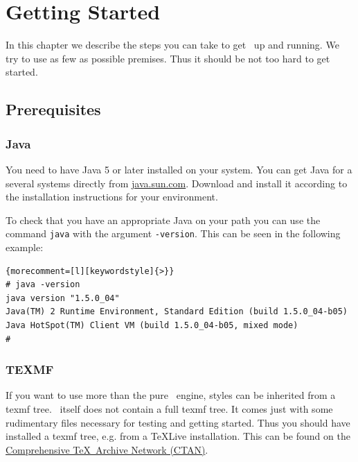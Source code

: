 
\chapter{Getting Started}

In this chapter we describe the steps you can take to get \ExBib\ up
and running. We try to use as few as possible premises. Thus it should
be not too hard to get started.

\section{Prerequisites}

\subsection{Java}

You need to have Java 5 or later installed on your
system. You can get Java for a several systems directly from
\url{java.sun.com}. Download and install it according to the
installation instructions for your environment.

To check that you have an appropriate Java on your path you can use
the command \texttt{java} with the argument \texttt{-version}. This
can be seen in the following example:

%
\begin{lstlisting}{morecomment=[l][keywordstyle]{>}}
# java -version
java version "1.5.0_04"
Java(TM) 2 Runtime Environment, Standard Edition (build 1.5.0_04-b05)
Java HotSpot(TM) Client VM (build 1.5.0_04-b05, mixed mode)
#
\end{lstlisting}


\subsection{TEXMF}

If you want to use more than the pure \ExBib\ engine, styles can be
inherited from a texmf tree. \ExBib\ itself does not
contain a full texmf tree. It comes just with some rudimentary files
necessary for testing and getting started. Thus you should have
installed a texmf tree, e.g. from a \TeX Live
installation. This can be found on the
\href{http://www.ctan.org}{Comprehensive \TeX\ Archive Network
  (CTAN)}.

